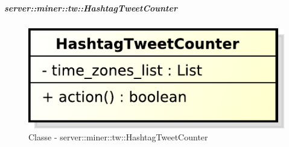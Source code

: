 	\subparagraph{server::miner::tw::HashtagTweetCounter} %
		\label{subp:server_miner_tw_HashtagTweetCounter}
		    \begin{figure}[!htbp]
 		 		\centering
 				\centerline{\includegraphics[scale=0.75]{./images/server/classes/miner/hashtag_tweet_counter.pdf}}
 				\caption{Classe - server::miner::tw::HashtagTweetCounter}
			\end{figure}
